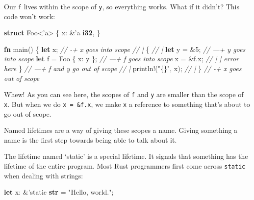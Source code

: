 \documentclass[a4paper,]{book}
\newenvironment{Shaded}{\begin{snugshade}}{\end{snugshade}}
\newcommand{\KeywordTok}[1]{\textcolor[rgb]{0.13,0.29,0.53}{\textbf{{#1}}}}
\newcommand{\DecValTok}[1]{\textcolor[rgb]{0.00,0.00,0.81}{{#1}}}
\newcommand{\StringTok}[1]{\textcolor[rgb]{0.31,0.60,0.02}{{#1}}}
\newcommand{\CommentTok}[1]{\textcolor[rgb]{0.56,0.35,0.01}{\textit{{#1}}}}
\newcommand{\OtherTok}[1]{\textcolor[rgb]{0.56,0.35,0.01}{{#1}}}
\newcommand{\NormalTok}[1]{{#1}}
\begin{document}
Our \texttt{f} lives within the scope of \texttt{y}, so everything
works. What if it didn't? This code won't work:

\begin{Shaded}
\begin{Highlighting}[]
\KeywordTok{struct} \NormalTok{Foo<}\OtherTok{'a}\NormalTok{> \{}
    \NormalTok{x: &}\OtherTok{'a} \KeywordTok{i32}\NormalTok{,}
\NormalTok{\}}

\KeywordTok{fn} \NormalTok{main() \{}
    \KeywordTok{let} \NormalTok{x;                    }\CommentTok{// -+ x goes into scope}
                              \CommentTok{//  |}
    \NormalTok{\{                         }\CommentTok{//  |}
        \KeywordTok{let} \NormalTok{y = &}\DecValTok{5}\NormalTok{;           }\CommentTok{// ---+ y goes into scope}
        \KeywordTok{let} \NormalTok{f = Foo \{ x: y \}; }\CommentTok{// ---+ f goes into scope}
        \NormalTok{x = &f.x;             }\CommentTok{//  | | error here}
    \NormalTok{\}                         }\CommentTok{// ---+ f and y go out of scope}
                              \CommentTok{//  |}
    \OtherTok{println!}\NormalTok{(}\StringTok{"\{\}"}\NormalTok{, x);        }\CommentTok{//  |}
\NormalTok{\}                             }\CommentTok{// -+ x goes out of scope}
\end{Highlighting}
\end{Shaded}

Whew! As you can see here, the scopes of \texttt{f} and \texttt{y} are
smaller than the scope of \texttt{x}. But when we do
\texttt{x\ =\ \&f.x}, we make \texttt{x} a reference to something that's
about to go out of scope.

Named lifetimes are a way of giving these scopes a name. Giving
something a name is the first step towards being able to talk about it.


The lifetime named `static' is a special lifetime. It signals that
something has the lifetime of the entire program. Most Rust programmers
first come across \texttt{\textquotesingle{}static} when dealing with
strings:

\begin{Shaded}
\begin{Highlighting}[]
\KeywordTok{let} \NormalTok{x: &}\OtherTok{'static} \KeywordTok{str} \NormalTok{= }\StringTok{"Hello, world."}\NormalTok{;}
\end{Highlighting}
\end{Shaded}
\end{document}
